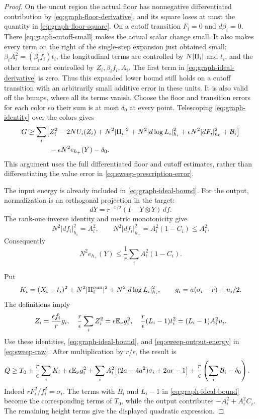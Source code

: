 \begin{proof}
On the uncut region the actual floor has nonnegative
differentiated contribution by
\eqref{eq:graph-floor-derivative}, and its square loses at
most the quantity in \eqref{eq:graph-floor-square}.
On a cutoff transition \(F_i=0\) and \(d\beta_i=0\).
There \eqref{eq:graph-cutoff-small} makes the actual scalar
change small.  It also makes every term on the right of the
single-step expansion just obtained small:
\(\beta_i A_i^2=(\beta_i f_i)t_i\),
the longitudinal terms are controlled by \(N|\mathrm{II}_i|\) and
\(t_i\), and the other terms are controlled by
\(Z_i,\beta_i f_i,A_i\).  The first term in
\eqref{eq:graph-ideal-derivative} is zero.  Thus this
expanded lower bound still holds on a cutoff transition with
an arbitrarily small additive error in these units.  It is
also valid off the bumps, where all its terms vanish.
Choose the floor and transition errors for each color so their
sum is at most \(\delta_0\) at every point.  Telescoping
\eqref{eq:graph-identity} over the colors gives
\begin{align}
 G\ge \sum_i\bigl[&
 Z_i^2-2NU_i(Z_i)+N^2|\mathrm{II}_i|^2
       +N^2|d\log L_i|_{h_i}^2
       +\epsilon N^2|dF_i|_{h_0}^2+\mathcal B_i\bigr]
 \notag\\
 &-\epsilon N^2e_{h_+}(Y)-\delta_0 .
 \label{eq:sweep-raw}
\end{align}
This argument uses the full differentiated floor and cutoff
estimates, rather than differentiating the value error in
\eqref{eq:sweep-prescription-error}.

The input energy is already included in
\eqref{eq:graph-ideal-bound}.  For the output, normalization is an
orthogonal projection in the target:
\[
 dY=r^{-1/2}(I-Y\otimes Y)\,df .
\]
The rank-one inverse identity and metric monotonicity give
\[
 N^2|df_i|_{h_i}^2=A_i^2,\qquad
 N^2|df_i|_{h_+}^2=A_i^2(1-C_i)\le A_i^2 .
\]
Consequently
\begin{equation}
 N^2e_{h_+}(Y)
       \le\frac1r\sum_i A_i^2(1-C_i).
 \label{eq:sweep-output-energy}
\end{equation}

Put
\[
 K_i=(X_i-t_i)^2+N^2|\mathrm{II}_i^{\mathrm{rem}}|^2
                 +N^2|d\log L_i|_{h_i}^2,\qquad
 g_i=a(\sigma_i-r)+u_i/2 .
\]
The definitions imply
\[
 Z_i=\frac{\epsilon f_i}{r}g_i,\quad
 \frac r\epsilon\sum_iZ_i^2=\epsilon\mathbb E_\nu g_i^2,\quad
 \frac r\epsilon(L_i-1)t_i^2=(L_i-1)A_i^2u_i .
\]
Use these identities, \eqref{eq:graph-ideal-bound}, and
\eqref{eq:sweep-output-energy} in \eqref{eq:sweep-raw}.
After multiplication by \(r/\epsilon\), the result is
\begin{align}
 Q\ge{}&T_0+\frac r\epsilon\sum_iK_i
       +\epsilon\mathbb E_\nu g_i^2
       +\sum_i A_i^2\bigl[(2a-4a^2)\sigma_i+2ar-1\bigr]
       +\frac r\epsilon\left(\sum_i\mathcal B_i-\delta_0\right).
 \label{eq:sweep-expanded}
\end{align}
Indeed \(rF_i^2/f_i^2=\sigma_i\).  The terms with \(B_i\) and
\(L_i-1\) in \eqref{eq:graph-ideal-bound} become the corresponding
terms of \(T_0\), while the output contributes
\(-A_i^2+A_i^2C_i\).  The remaining height terms give the displayed
quadratic expression.


\end{proof}
